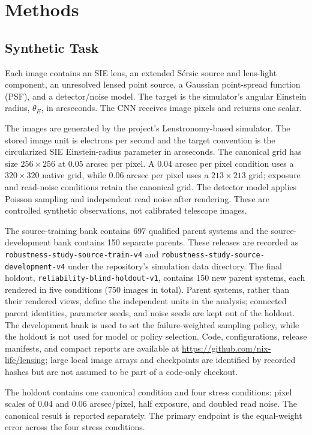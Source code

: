 \documentclass[letterpaper]{article}
\begin{document}
\section{Methods}

\subsection{Synthetic Task}

Each image contains an SIE lens, an extended S\'ersic source and lens-light
component, an unresolved lensed point source, a Gaussian point-spread function
(PSF), and a detector/noise model. The target is the simulator's angular
Einstein radius, $\theta_E$, in arcseconds. The CNN receives image pixels and
returns one scalar.

The images are generated by the project's Lenstronomy-based simulator. The
stored image unit is electrons per second and the target convention is the
circularized SIE Einstein-radius parameter in arcseconds. The canonical grid
has size $256\times256$ at 0.05 arcsec per pixel. A 0.04 arcsec per pixel
condition uses a $320\times320$ native grid, while 0.06 arcsec per pixel uses a
$213\times213$ grid; exposure and read-noise conditions retain the canonical
grid. The detector model applies Poisson sampling and independent read noise
after rendering. These are controlled synthetic observations, not calibrated
telescope images.

The source-training bank contains 697 qualified parent systems and the
source-development bank contains 150 separate parents. These releases are
recorded as \texttt{robustness-study-source-train-v4} and
\texttt{robustness-study-source-development-v4} under the repository's
simulation data directory. The final holdout,
\texttt{reliability-blind-holdout-v1}, contains 150
new parent systems, each rendered in five conditions (750 images in total).
Parent systems, rather than their rendered views, define the independent units
in the analysis; connected parent identities, parameter seeds, and noise seeds
are kept out of the holdout. The development bank is used to set the
failure-weighted sampling policy, while the holdout is not used for model or
policy selection. Code, configurations, release manifests, and compact reports
are available at \url{https://github.com/nix-life/lensing}; large local image
arrays and checkpoints are identified by recorded hashes but are not assumed to
be part of a code-only checkout.

The holdout contains one canonical condition and four stress conditions:
pixel scales of 0.04 and 0.06 arcsec/pixel, half exposure, and doubled read
noise. The canonical result is reported separately. The primary endpoint is
the equal-weight error across the four stress conditions.
\end{document}
